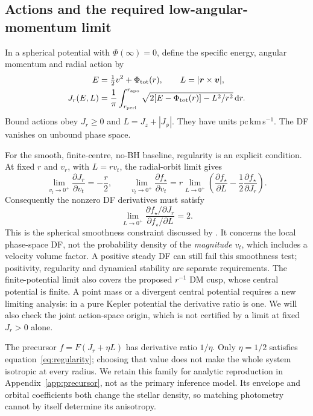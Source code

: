 \documentclass[11pt,a4paper]{article}
\newcommand{\dd}{\mathrm{d}}
\begin{document}
\subsection{Actions and the required low-angular-momentum limit}

In a spherical potential with $\Phi(\infty)=0$, define the specific energy,
angular momentum and radial action by
\begin{align}
 E&=\tfrac12 v^2+\Phi_{\rm tot}(r),\qquad L=|\boldsymbol r\times\boldsymbol v|,
 \\
 J_r(E,L)&=\frac{1}{\pi}\int_{r_{\rm peri}}^{r_{\rm apo}}
 \sqrt{2[E-\Phi_{\rm tot}(r)]-L^2/r^2}\,\dd r.
 \label{eq:jr}
\end{align}
Bound actions obey $J_r\geq0$ and $L=J_z+|J_\phi|$. They have units
pc\,km\,s$^{-1}$. The DF vanishes on unbound phase space.

For the smooth, finite-centre, no-BH baseline, regularity is an explicit
condition. At fixed $r$ and $v_r$, with $L=rv_t$, the radial-orbit limit gives
\begin{equation}
 \lim_{v_t\to0^+}\frac{\partial J_r}{\partial v_t}=-\frac r2,
 \qquad
 \lim_{v_t\to0^+}\frac{\partial f_\star}{\partial v_t}
 =r\lim_{L\to0^+}\left(\frac{\partial f_\star}{\partial L}
                  -\frac12\frac{\partial f_\star}{\partial J_r}\right).
 \label{eq:regularity-cancellation}
\end{equation}
Consequently the nonzero DF derivatives must satisfy
\begin{equation}
 \boxed{\lim_{L\to0^+}
 \frac{\partial f_\star/\partial J_r}{\partial f_\star/\partial L}=2.}
 \label{eq:regularity}
\end{equation}
This is the spherical smoothness constraint discussed by
\citet{2026MNRAS.549ag854B}. It concerns the local phase-space DF, not the
probability density of the \emph{magnitude} $v_t$, which includes a velocity
volume factor. A positive steady DF can still fail this smoothness test;
positivity, regularity and dynamical stability are separate requirements.
The finite-potential limit also covers the proposed $r^{-1}$ DM cusp, whose
central potential is finite. A point mass or a divergent central potential
requires a new limiting analysis: in a pure Kepler potential the derivative
ratio is one. We will also check the joint action-space origin, which is not
certified by a limit at fixed $J_r>0$ alone.

The precursor $f=F(J_r+\eta L)$ has derivative ratio $1/\eta$. Only
$\eta=1/2$ satisfies equation~\eqref{eq:regularity}; choosing that value does
not make the whole system isotropic at every radius. We retain this family
for analytic reproduction in Appendix~\ref{app:precursor}, not as the primary
inference model. Its envelope and orbital coefficients both change the
stellar density, so matching photometry cannot by itself determine its
anisotropy.
\end{document}
